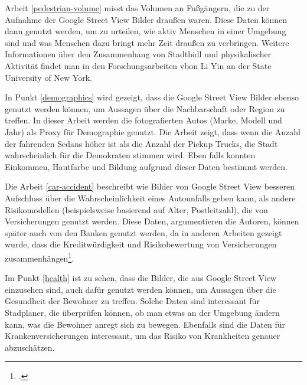 Arbeit \ref{pedestrian-volume} misst das Volumen an Fußgängern, die zu der
Aufnahme der Google Street View Bilder draußen waren. Diese Daten können dann
genutzt werden, um zu urteilen, wie aktiv Menschen in einer Umgebung sind und
was Menschen dazu bringt mehr Zeit draußen zu verbringen. Weitere Informationen
über den Zusammenhang von Stadtbidl und physikalischer Aktivität findet man in
den Forschungsarbeiten vbon Li Yin an der State University of New York.

In Punkt \ref{demographics} wird gezeigt, dass die Google Street View Bilder
ebenso genutzt werden können, um Aussagen über die Nachbarschaft oder Region zu
treffen. In dieser Arbeit werden die fotografierten Autos (Marke, Modell und
Jahr) als Proxy für Demographie genutzt. Die Arbeit zeigt, dass wenn die Anzahl
der fahrenden Sedans höher ist als die Anzahl der Pickup Trucks, die Stadt
wahrscheinlich für die Demokraten stimmen wird. Eben falls konnten Einkommen,
Hautfarbe und Bildung aufgrund dieser Daten bestimmt werden.

Die Arbeit \ref{car-accident} beschreibt wie Bilder von Google Street View
besseren Aufschluss über die Wahrscheinlichkeit eines Autounfalls geben kann,
als andere Risikomodellen (beispielsweise basierend auf Alter, Postleitzahl),
die von Versicherungen genutzt werden. Diese Daten, argumentieren die Autoren,
können später auch von den Banken genutzt werden, da in anderen Arbeiten gezeigt
wurde, dass die Kreditwürdigkeit und Risikobewertung von Versicherungen
zusammenhängen\footcite{doi:10.1080/10920277.2016.1209118}.

Im Punkt \ref{health} ist zu sehen, dass die Bilder, die aus Google Street View
einzusehen sind, auch dafür genutzt werden können, um Aussagen über die
Gesundheit der Bewohner zu treffen. Solche Daten sind interessant für
Stadplaner, die überprüfen können, ob man etwas an der Umgebung ändern kann, was
die Bewohner anregt sich zu bewegen. Ebenfalls sind die Daten für
Krankenversicherungen interessant, um das Risiko von Krankheiten genauer abzuschätzen.

